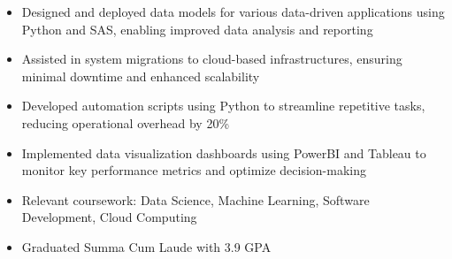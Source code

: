 \par\smallskip
\begin{minipage}{13.75cm}
  \begin{minipage}{6.5cm}
    \begin{itemize}
      \item Designed and deployed data models for various data-driven applications using Python and SAS, enabling improved data analysis and reporting
      \item Assisted in system migrations to cloud-based infrastructures, ensuring minimal downtime and enhanced scalability
    \end{itemize}
  \end{minipage}
  \hfill
  \begin{minipage}{6.5cm}
    \begin{itemize}
      \item Developed automation scripts using Python to streamline repetitive tasks, reducing operational overhead by 20\%
      \item Implemented data visualization dashboards using PowerBI and Tableau to monitor key performance metrics and optimize decision-making
    \end{itemize}
  \end{minipage}
\end{minipage}

\par\bigskip
{}
\begin{itemize}
  \item Relevant coursework: Data Science, Machine Learning, Software Development, Cloud Computing
\end{itemize}
\divider

\begin{itemize}
  \item Graduated Summa Cum Laude with 3.9 GPA
\end{itemize}


